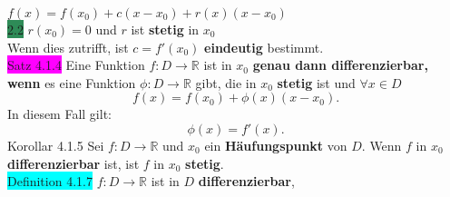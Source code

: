 \documentclass[landscape, 10pt]{article}
\newcommand{\R}{\mathbb{R}}
\begin{document}
\begin{multicols}{3}
{                                   $f(x)=f(x_0)+c(x-x_0)
                                   +r(x)(x-x_0)$} \\
                            \colorbox{SeaGreen}{2.2} 
                                   \textcolor{NavyBlue}{
                                   $r(x_0)=0$} und 
                                   \textcolor{NavyBlue}{$r$} 
                                   ist \textbf{stetig}
                                   in \textcolor{NavyBlue}{
                                   $x_0$}\\
                     Wenn dies zutrifft, ist 
                     \textcolor{NavyBlue}{$c=f'(x_0)$} 
                     \textbf{eindeutig} bestimmt.\\
              \colorbox{magenta}{Satz 4.1.4} 
                     Eine Funktion 
                     \textcolor{NavyBlue}{
                     $f:D\longrightarrow\R$} ist in 
                     $x_0$ \textbf{genau dann 
                     differenzierbar, wenn} es eine 
                     Funktion \textcolor{NavyBlue}{
                     $\phi:D\longrightarrow\R$}
                     gibt, die in \textcolor{NavyBlue}{$x_0$} 
                     \textbf{stetig} ist und 
                     \textcolor{NavyBlue}{$\forall x\in D$}
                     \begin{equation*}
                            f(x)=f(x_0)+\phi(x)(x-x_0).
                     \end{equation*}
                     In diesem Fall gilt: 
                     \begin{equation*}
                            \phi(x)=f'(x).
                     \end{equation*}
              \colorbox{BurntOrange}{Korollar 4.1.5} 
                     Sei \textcolor{NavyBlue}{
                     $f:D\longrightarrow\R$}
                     und \textcolor{NavyBlue}{$x_0$} 
                     ein \textbf{Häufungspunkt} von 
                     \textcolor{NavyBlue}{$D$}. 
                     Wenn \textcolor{NavyBlue}{$f$} in 
                     \textcolor{NavyBlue}{$x_0$} 
                     \textbf{differenzierbar} ist, ist 
                     \textcolor{NavyBlue}{$f$} in 
                     \textcolor{NavyBlue}{$x_0$} 
                     \textbf{stetig}.\\
              \colorbox{cyan}{Definition 4.1.7} 
                     \textcolor{NavyBlue}{$f:D\longrightarrow\R$} 
                     ist in \textcolor{NavyBlue}{$D$} 
                     \textbf{differenzierbar}, 

\end{multicols}
\end{document}
